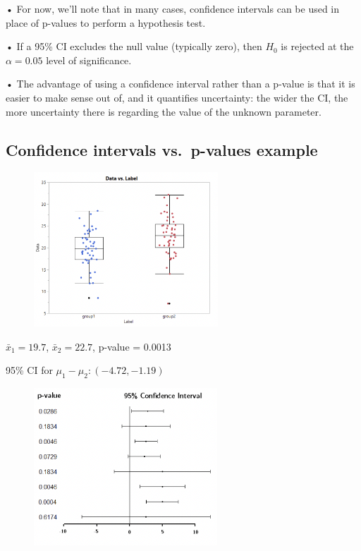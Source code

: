 \documentclass[
  letterpaper,
  DIV=11,
  numbers=noendperiod]{scrreprt}
\begin{document}
• For now, we'll note that in many cases, confidence intervals can be
used in place of p-values to perform a hypothesis test.

• If a 95\% CI excludes the null value (typically zero), then \(H_0\) is
rejected at the \(\alpha = 0.05\) level of significance.

• The advantage of using a confidence interval rather than a p-value is
that it is easier to make sense out of, and it quantifies uncertainty:
the wider the CI, the more uncertainty there is regarding the value of
the unknown parameter.

\hypertarget{confidence-intervals-vs.-p-values-example}{%
\subsection{Confidence intervals vs.~p-values
example}\label{confidence-intervals-vs.-p-values-example}}

\begin{figure}

\includegraphics[width=2.71875in,height=\textheight]{images/mod1_14.png} \hfill{}

\end{figure}

\(\bar{x}_1 = 19.7\), \(\bar{x}_2 = 22.7\), p-value = 0.0013

95\% CI for \(\mu_1 - \mu_2: (-4.72,-1.19)\)

\begin{figure}

\includegraphics[width=2.70833in,height=\textheight]{images/mod1_15.png} \hfill{}

\end{figure}
\end{document}
